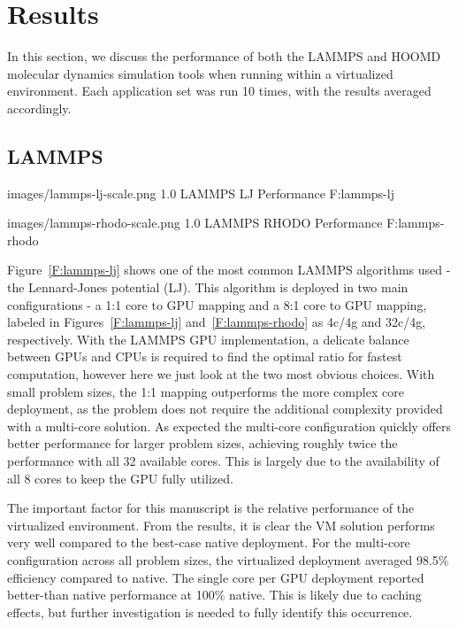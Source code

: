 \documentclass[10pt]{sigplanconf}
\begin{document}
 
\section{Results}\label{results}

In this section, we discuss the performance of both the LAMMPS and HOOMD molecular dynamics simulation tools when running within a virtualized environment. 
Each application set was run 10 times, with the results averaged accordingly. 

\subsection{LAMMPS}


  {images/lammps-lj-scale.png}
  {1.0}
  {LAMMPS LJ Performance}
  {F:lammps-lj}

  {images/lammps-rhodo-scale.png}
  {1.0}
  {LAMMPS RHODO Performance}
  {F:lammps-rhodo}


Figure~\ref{F:lammps-lj} shows one of the most common LAMMPS algorithms used - the Lennard-Jones potential (LJ).  This algorithm is deployed in two main configurations - a 1:1 core to GPU mapping and a 8:1 core to GPU mapping, labeled in Figures~\ref{F:lammps-lj} and~\ref{F:lammps-rhodo} as 4c/4g and 32c/4g, respectively.  With the LAMMPS GPU implementation, a delicate balance between GPUs and CPUs is required to find the optimal ratio for fastest computation, however here we just look at the two most obvious choices. With small problem sizes, the 1:1 mapping outperforms the more complex core deployment, as the problem does not require the additional complexity provided with a multi-core solution.  As expected the multi-core configuration quickly offers better performance for larger problem sizes, achieving roughly twice the performance with all 32 available cores. 
This is largely due to the availability of all 8 cores to keep the GPU fully utilized.

The important factor for this manuscript is the relative performance of the virtualized environment. From the results, it is clear the VM solution performs very well compared to the best-case native deployment. For the multi-core configuration across all problem sizes, the virtualized deployment averaged 98.5\% efficiency compared to native. The single core per GPU deployment reported better-than native performance at 100\% native.  This is likely due to caching effects, but further investigation is needed to fully identify this occurrence. 
\end{document}
